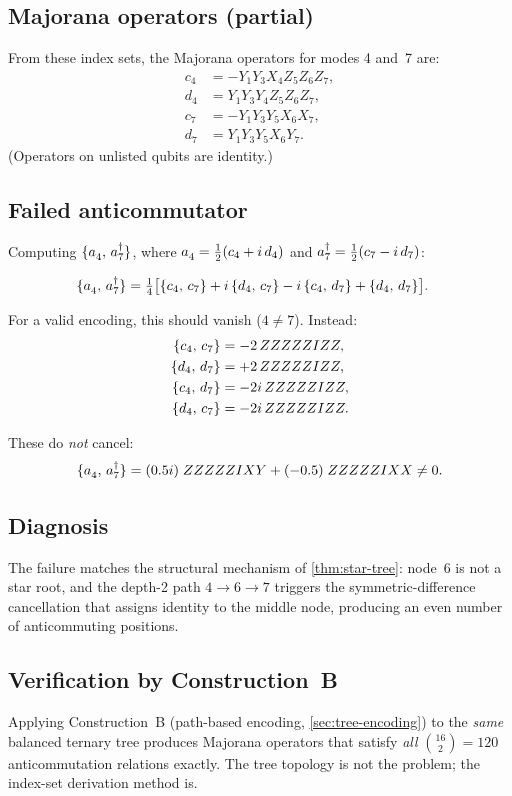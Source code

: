 \subsection*{Majorana operators (partial)}

From these index sets, the Majorana operators for modes 4 and~7 are:
\begin{align*}
  c_4 &= -Y_1 Y_3 X_4 Z_5 Z_6 Z_7, \\
  d_4 &= Y_1 Y_3 Y_4 Z_5 Z_6 Z_7, \\
  c_7 &= -Y_1 Y_3 Y_5 X_6 X_7, \\
  d_7 &= Y_1 Y_3 Y_5 X_6 Y_7.
\end{align*}
(Operators on unlisted qubits are identity.)

\subsection*{Failed anticommutator}

Computing $\acomm{\an{4}}{\ad{7}}$, where
$\an{4} = \tfrac{1}{2}(c_4 + i\,d_4)$ and
$a_{7}^{\dagger} = \tfrac{1}{2}(c_7 - i\,d_7)$:

\begin{align*}
  \acomm{\an{4}}{\ad{7}}
    &= \tfrac{1}{4}\bigl[
      \acomm{c_4}{c_7} + i\,\acomm{d_4}{c_7}
      - i\,\acomm{c_4}{d_7} + \acomm{d_4}{d_7}
    \bigr].
\end{align*}

For a valid encoding, this should vanish ($4 \neq 7$).  Instead:
\begin{align*}
  \{c_4,\,c_7\} &= -2\,ZZZZZIZZ, \\
  \{d_4,\,d_7\} &= +2\,ZZZZZIZZ, \\
  \{c_4,\,d_7\} &= -2i\,ZZZZZIZZ, \\
  \{d_4,\,c_7\} &= -2i\,ZZZZZIZZ.
\end{align*}

These do \emph{not} cancel:
\begin{equation*}
  \acomm{\an{4}}{\ad{7}} = (0.5i)\; ZZZZZIXY + (-0.5)\; ZZZZZIXX
    \neq 0.
\end{equation*}

\subsection*{Diagnosis}

The failure matches the structural mechanism of
\cref{thm:star-tree}: node~6 is not a star root, and the
depth-2 path $4 \to 6 \to 7$ triggers the symmetric-difference
cancellation that assigns identity to the middle node, producing an
even number of anticommuting positions.

\subsection*{Verification by Construction~B}

Applying Construction~B (path-based encoding, \cref{sec:tree-encoding})
to the \emph{same} balanced ternary tree produces Majorana operators
that satisfy \emph{all} $\binom{16}{2} = 120$ anticommutation
relations exactly.  The tree topology is not the problem; the
index-set derivation method is.
